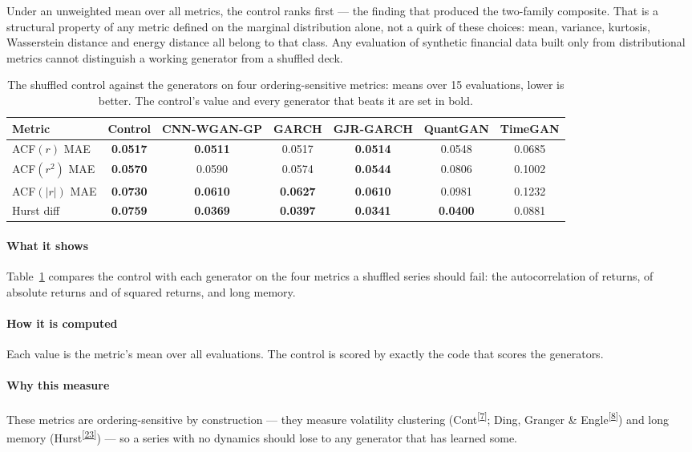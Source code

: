 \documentclass[11pt,a4paper]{article}
\makeatletter
\newcommand{\tcite}[1]{\textsuperscript{[\hyperlink{R:#1}{#1}]}}
\DeclareRobustCommand{\_}{\ifmmode\nfss@text{\textunderscore}\else\textunderscore\allowbreak\fi}
\makeatother
\begin{document}
Under an unweighted mean over all metrics, the control ranks first --- the finding that produced the two-family composite. That is a structural property of any metric defined on the marginal distribution alone, not a quirk of these choices: mean, variance, kurtosis, Wasserstein distance and energy distance all belong to that class. Any evaluation of synthetic financial data built only from distributional metrics cannot distinguish a working generator from a shuffled deck.

\begin{table}[htbp]
\centering
\caption{The shuffled control against the generators on four ordering-sensitive metrics: means over 15 evaluations, lower is better. The control's value and every generator that beats it are set in bold.}
\label{tab:control}
\begin{tabular}{@{}lcccccc@{}}
\toprule
Metric & Control & CNN-WGAN-GP & GARCH & GJR-GARCH & QuantGAN & TimeGAN \\
\midrule
ACF$(r)$ MAE & \textbf{0.0517} & \textbf{0.0511} & 0.0517 & \textbf{0.0514} & 0.0548 & 0.0685 \\
ACF$(r^2)$ MAE & \textbf{0.0570} & 0.0590 & 0.0574 & \textbf{0.0544} & 0.0806 & 0.1002 \\
ACF$(|r|)$ MAE & \textbf{0.0730} & \textbf{0.0610} & \textbf{0.0627} & \textbf{0.0610} & 0.0981 & 0.1232 \\
Hurst diff & \textbf{0.0759} & \textbf{0.0369} & \textbf{0.0397} & \textbf{0.0341} & \textbf{0.0400} & 0.0881 \\
\bottomrule
\end{tabular}
\end{table}

\paragraph{What it shows} Table~\ref{tab:control} compares the control with each generator on the four metrics a shuffled series should fail: the autocorrelation of returns, of absolute returns and of squared returns, and long memory.

\paragraph{How it is computed} Each value is the metric's mean over all evaluations. The control is scored by exactly the code that scores the generators.

\paragraph{Why this measure} These metrics are ordering-sensitive by construction --- they measure volatility clustering (Cont\tcite{7}; Ding, Granger \& Engle\tcite{8}) and long memory (Hurst\tcite{23}) --- so a series with no dynamics should lose to any generator that has learned some.
\end{document}
